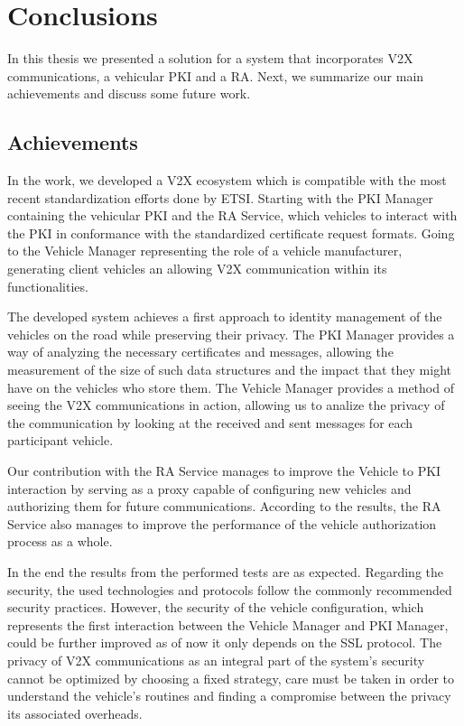 \chapter{Conclusions}
\label{chapter:conclusions}
In this thesis we presented a solution for a system that incorporates V2X communications, a vehicular PKI and a RA. Next, we summarize our main achievements and discuss some future work.

\section{Achievements}
\label{section:achievements}
In the work, we developed a V2X ecosystem which is compatible with the most recent standardization efforts done by ETSI. Starting with the PKI Manager containing the vehicular PKI and the RA Service, which vehicles to interact with the PKI in conformance with the standardized certificate request formats. Going to the Vehicle Manager representing the role of a vehicle manufacturer, generating client vehicles an allowing V2X communication within its functionalities.

The developed system achieves a first approach to identity management of the vehicles on the road while preserving their privacy. The PKI Manager provides a way of analyzing the necessary certificates and messages, allowing the measurement of the size of such data structures and the impact that they might have on the vehicles who store them. The Vehicle Manager provides a method of seeing the V2X communications in action, allowing us to analize the privacy of the communication by looking at the received and sent messages for each participant vehicle.

Our contribution with the RA Service manages to improve the Vehicle to PKI interaction by serving as a proxy capable of configuring new vehicles and authorizing them for future communications. According to the results, the RA Service also manages to improve the performance of the vehicle authorization process as a whole.

In the end the results from the performed tests are as expected. Regarding the security, the used technologies and protocols follow the commonly recommended security practices. However, the security of the vehicle configuration, which represents the first interaction between the Vehicle Manager and PKI Manager, could be further improved as of now it only depends on the SSL protocol. The privacy of V2X communications as an integral part of the system's security cannot be optimized by choosing a fixed strategy, care must be taken in order to understand the vehicle's routines and finding a compromise between the privacy its associated overheads.

